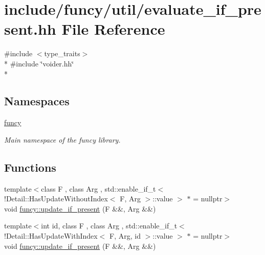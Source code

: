 \hypertarget{evaluate__if__present_8hh}{\section{include/funcy/util/evaluate\-\_\-if\-\_\-present.hh File Reference}
\label{evaluate__if__present_8hh}
}
{\ttfamily \#include $<$type\-\_\-traits$>$}\\*
{\ttfamily \#include \char`\"{}voider.\-hh\char`\"{}}\\*
\subsection*{Namespaces}
\begin{DoxyCompactItemize}
\item 
\hyperlink{namespacefuncy}{funcy}
\begin{DoxyCompactList}\small\item\em Main namespace of the funcy library. \end{DoxyCompactList}\end{DoxyCompactItemize}
\subsection*{Functions}
\begin{DoxyCompactItemize}
\item 
{\footnotesize template$<$class F , class Arg , std\-::enable\-\_\-if\-\_\-t$<$!\-Detail\-::\-Has\-Update\-Without\-Index$<$ F, Arg $>$\-::value $>$ $\ast$  = nullptr$>$ }\\void \hyperlink{namespacefuncy_a194c43494e614dfa1f924cf2893860ae}{funcy\-::update\-\_\-if\-\_\-present} (F \&\&, Arg \&\&)
\item 
{\footnotesize template$<$int id, class F , class Arg , std\-::enable\-\_\-if\-\_\-t$<$!\-Detail\-::\-Has\-Update\-With\-Index$<$ F, Arg, id $>$\-::value $>$ $\ast$  = nullptr$>$ }\\void \hyperlink{namespacefuncy_a9227e0e45bf126bb189cfbf50b91a902}{funcy\-::update\-\_\-if\-\_\-present} (F \&\&, Arg \&\&)
\end{DoxyCompactItemize}
